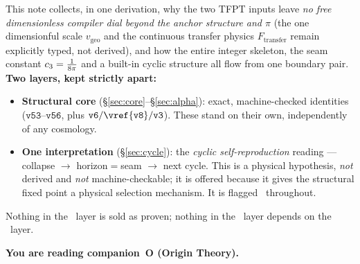 
\maketitle
\vspace{-0.7cm}

\begin{keybox}
This note collects, in one derivation, why the two TFPT inputs leave \emph{no free dimensionless
compiler dial beyond the anchor structure and $\pi$} (the one dimensionful scale $v_{\mathrm{geo}}$ and
the continuous transfer physics $F_{\mathrm{transfer}}$ remain explicitly typed, not derived), and how
the entire integer skeleton, the seam constant $c_3=\tfrac1{8\pi}$ and a built-in cyclic
structure all flow from one boundary pair. \textbf{Two layers, kept strictly apart:}
\begin{itemize}[leftmargin=1.3em]
\item \textbf{Structural core \mE} (\S\ref{sec:core}--\S\ref{sec:alpha}): exact, machine-checked
identities ($\mathtt{v53}$--$\mathtt{v56}$, plus $\mathtt{v6/\vref{v8}/v3}$). These stand on their own,
independently of any cosmology.
\item \textbf{One interpretation \mC} (\S\ref{sec:cycle}): the \emph{cyclic self-reproduction} reading
--- collapse $\to$ horizon$=$seam $\to$ next cycle. This is a physical hypothesis, \emph{not} derived and
\emph{not} machine-checkable; it is offered because it gives the structural fixed point a physical
selection mechanism. It is flagged \mC\ throughout.
\end{itemize}
Nothing in the \mC\ layer is sold as proven; nothing in the \mE\ layer depends on the \mC\ layer.
\end{keybox}
\markerkey

\tableofcontents


\noindent\textbf{You are reading \textbf{companion~O} (Origin Theory).}


\TFPTbadges
\TFPTclaimstack[anchor]

\bigskip

